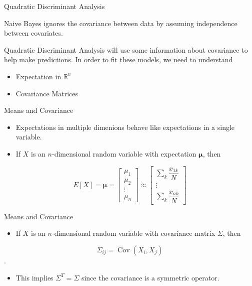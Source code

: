 \documentclass[12pt,ignorenonframetext,]{beamer}
\providecommand{\tightlist}{%
	\setlength{\itemsep}{0pt}\setlength{\parskip}{0pt}}
\begin{document}
\begin{frame}{Quadratic Discriminant Analysis}
\protect\hypertarget{quadratic-discriminant-analysis-1}{}

Naive Bayes ignores the covariance between data by assuming independence
between covariates.

Quadratic Discriminant Analysis will use some information about
covariance to help make predictions. In order to fit these models, we
need to understand

\begin{itemize}
\tightlist
\item
  Expectation in \(\mathbb{R}^n\)
\item
  Covariance Matrices
\end{itemize}

\end{frame}

\begin{frame}{Means and Covariance}
\protect\hypertarget{means-and-covariance}{}

\begin{itemize}
\item
  Expectations in multiple dimenions behave like expectations in a
  single variable.
\item
  If \(X\) is an \(n\)-dimensional random variable with expectation
  \(\boldsymbol{\mu}\), then
\end{itemize}

\[ E[X] =  \boldsymbol{\mu} = \begin{bmatrix} \mu_1 \\ \mu_2 \\ \vdots \\ \mu_n  \end{bmatrix} \approx \begin{bmatrix} \sum_k \dfrac{x_{1k}}{N}  \\ \vdots \\ \sum_k \dfrac{x_{nk}}{N} \end{bmatrix} \]

\end{frame}

\begin{frame}{Means and Covariance}
\protect\hypertarget{means-and-covariance-1}{}

\begin{itemize}
\tightlist
\item
  If \(X\) is an \(n\)-dimensional random variable with covariance
  matrix \(\Sigma\), then
\end{itemize}

\[\Sigma_{ij} = \operatorname{Cov}(X_i,X_j) \].

\begin{itemize}
\tightlist
\item
  This implies \(\Sigma^T = \Sigma\) since the covariance is a symmetric
  operator.
\end{itemize}

\end{frame}
\end{document}
